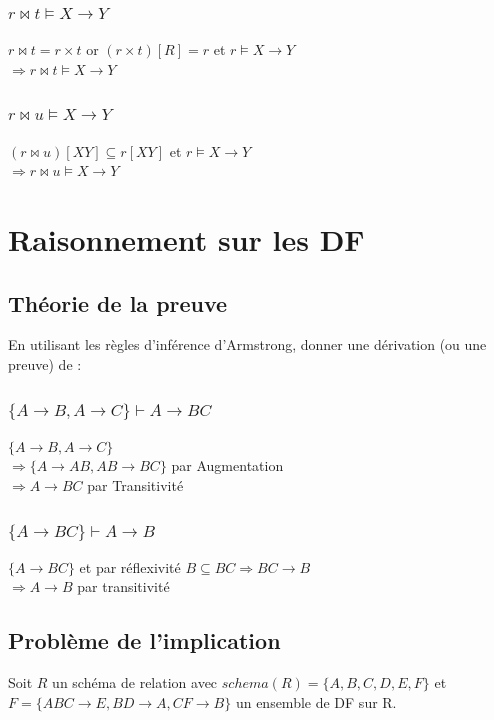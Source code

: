 \documentclass[10pt,a4paper,twoside]{article}
\begin{document}
\subsubsection{$r \bowtie t \models X \rightarrow Y$}
$r \bowtie t = r \times t$ or $(r\times t)[R]=r$ et $r \models X\rightarrow Y$\\
$\Rightarrow r \bowtie t \models X \rightarrow Y$

\subsubsection{$r \bowtie u \models X \rightarrow Y$}
$(r \bowtie u)[XY] \subseteq r[XY]$ et $r \models X\rightarrow Y$\\
$\Rightarrow r \bowtie u \models X \rightarrow Y$

\section{Raisonnement sur les DF}
\subsection{Théorie de la preuve}
En utilisant les règles d'inférence d'Armstrong, donner une dérivation (ou une preuve) de :
\subsubsection{$\{A\rightarrow B, A\rightarrow C\} \vdash A \rightarrow BC $}
$\{A\rightarrow B, A\rightarrow C\}$\\
$\Rightarrow \{A\rightarrow AB, AB\rightarrow BC\}$ par Augmentation\\
$\Rightarrow A \rightarrow BC$ par Transitivité
\subsubsection{$\{A\rightarrow BC\} \vdash A \rightarrow B$}
$\{A\rightarrow BC\}$ et par réflexivité $B \subseteq BC \Rightarrow BC \rightarrow B$\\
$\Rightarrow A \rightarrow B$ par transitivité

\subsection{Problème de l'implication}
Soit $R$ un schéma de relation avec $schema(R)=\{A,B,C,D,E,F\}$ et $F=\{ABC\rightarrow E, BD\rightarrow A, CF\rightarrow B\}$ un ensemble de DF sur R.
\end{document}
